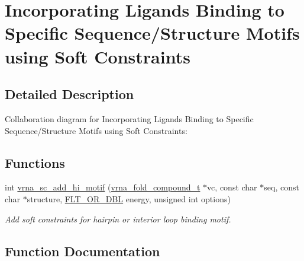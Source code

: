 \hypertarget{group__constraints__ligand}{}\section{Incorporating Ligands Binding to Specific Sequence/\+Structure Motifs using Soft Constraints}
\label{group__constraints__ligand}


\subsection{Detailed Description}
Collaboration diagram for Incorporating Ligands Binding to Specific Sequence/\+Structure Motifs using Soft Constraints\+:
\subsection*{Functions}
\begin{DoxyCompactItemize}
\item 
int \mbox{\hyperlink{group__constraints__ligand_gaa6ff0113a3a76dc0b8d62961f4e1dfa0}{vrna\+\_\+sc\+\_\+add\+\_\+hi\+\_\+motif}} (\mbox{\hyperlink{group__fold__compound_ga1b0cef17fd40466cef5968eaeeff6166}{vrna\+\_\+fold\+\_\+compound\+\_\+t}} $\ast$vc, const char $\ast$seq, const char $\ast$structure, \mbox{\hyperlink{group__data__structures_ga31125aeace516926bf7f251f759b6126}{F\+L\+T\+\_\+\+O\+R\+\_\+\+D\+BL}} energy, unsigned int options)
\begin{DoxyCompactList}\small\item\em Add soft constraints for hairpin or interior loop binding motif. \end{DoxyCompactList}\end{DoxyCompactItemize}


\subsection{Function Documentation}
\mbox{\label{group__constraints__ligand_gaa6ff0113a3a76dc0b8d62961f4e1dfa0}} 
